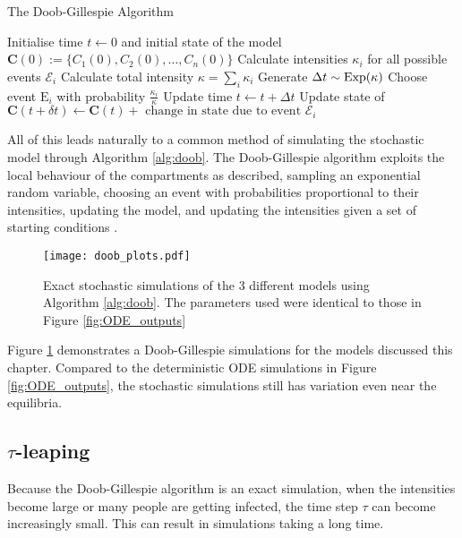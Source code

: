 \begin{algorithm}[htbp]
    \caption{The Doob-Gillespie Algorithm}\label{alg:doob}
    \begin{algorithmic}
        \State Initialise time $t \gets 0$ and initial state of the model $\mathbf{C}(0) := \{C_1(0), C_2(0), \dots, C_n(0)\}$
        \State Calculate intensities $\kappa_i$ for all possible events $\mathcal{E}_i$
        \State Calculate total intensity $\kappa = \sum_i \kappa_i$
        \State Generate $\Delta t \sim \operatorname{Exp}(\kappa)$
        \State Choose event $\mathrm{E}_i$ with probability $\frac{\kappa_i}{\kappa}$
        \State Update time $t \gets t + \Delta t$
        \State Update state of $\mathbf{C}(t + \delta t) \gets \mathbf{C}(t) + \text{ change in state due to event } \mathcal{E}_i$
        \EndWhile
    \end{algorithmic}
\end{algorithm}

All of this leads naturally to a common method of simulating the stochastic 
model through Algorithm \ref{alg:doob}. 
The Doob-Gillespie algorithm 
exploits the local behaviour of the compartments as described, sampling
an exponential random variable, choosing an event with probabilities 
proportional to their intensities, updating the model, and updating the 
intensities given a 
set of starting conditions \parencite{gillespie_exact_1977}.

\begin{figure}[htbp]
    \texttt{[image: doob\_plots.pdf]}
    \caption{
        Exact stochastic simulations of the 3 different models using 
        Algorithm \ref{alg:doob}. The parameters used were identical to 
        those in Figure \ref{fig:ODE_outputs}}
        \label{fig:doob_outputs}
\end{figure}

Figure \ref{fig:doob_outputs} demonstrates a Doob-Gillespie simulations for the
models discussed this chapter. Compared to the deterministic ODE simulations
in Figure \ref{fig:ODE_outputs}, the stochastic simulations still has variation
even near the equilibria.

\subsection*{\texorpdfstring{$\tau$}{Lg}-leaping}

Because the Doob-Gillespie algorithm is an exact simulation, when the 
intensities become large or many people are getting infected, the time step
$\tau$ can become increasingly small. This can result in simulations taking
a long time.

